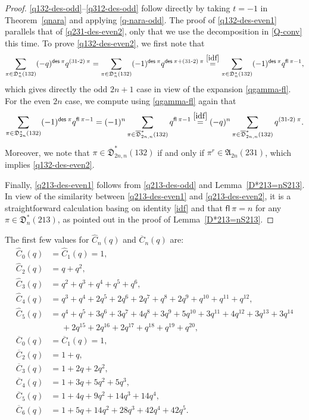 \documentclass[12pt,reqno]{amsart}
\numberwithin{equation}{section}
\theoremstyle{plain}
\theoremstyle{definition}
\def\D{\mathfrak{D}}
\def\A{\mathfrak{A}}
\def\des{\mathsf{des}}
\def\cab{31\text{-}2}
\def\fl{\mathsf{fl}}
\begin{document}
\begin{proof}
\eqref{q132-des-odd}--\eqref{q312-des-odd} follow directly by taking $t=-1$ in Theorem~\ref{qnara} and applying \eqref{q-nara-odd}. The proof of \eqref{q132-des-even1} parallels that of \eqref{q231-des-even2}, only that we use the decomposition in \eqref{Q-conv} this time. To prove \eqref{q132-des-even2}, we first note that
$$\sum_{\pi\in\D^*_n(132)}(-q)^{\des\:\pi}q^{(\cab)\:\pi}=\sum_{\pi\in\D^*_n(132)}(-1)^{\des\:\pi}q^{\des\:\pi+(\cab)\:\pi}\stackrel{\eqref{idf}}
{=}\sum_{\pi\in\D^*_n(132)}(-1)^{\des\:\pi}q^{\fl\:\pi-1},$$ which gives directly the odd $2n+1$ case in view of the expansion \eqref{qgamma-fl}. For the even $2n$ case, we compute using \eqref{qgamma-fl} again that
$$\sum_{\pi\in\D^*_{2n}(132)}(-1)^{\des\:\pi}q^{\fl\:\pi-1}=(-1)^n\sum_{\pi\in\overline{\D}^*_{2n,n}(132)}q^{\fl\:\pi-1}\stackrel{\eqref{idf}}
{=}(-q)^n\sum_{\pi\in\overline{\D}^*_{2n,n}(132)}q^{(\cab)\:\pi}.$$
Moreover, we note that $\pi\in \overline{\D}^*_{2n,n}(132)$ if and only if $\pi^r\in \A_{2n}(231)$, which implies \eqref{q132-des-even2}.

Finally, \eqref{q213-des-even1} follows from \eqref{q213-des-odd} and Lemma~\ref{D*213=nS213}. In view of the similarity between \eqref{q213-des-even1} and \eqref{q213-des-even2}, it is a straightforward calculation basing on identity \eqref{idf} and that $\fl\:\pi=n$ for any $\pi\in\D^*_n(213)$, as pointed out in the proof of Lemma~\ref{D*213=nS213}.
\end{proof}


The first few values for $\widehat{C}_n(q)$ and $\overline{C}_n(q)$ are:
\begin{align*}
\widehat{C}_0(q) &=\widehat{C}_1(q) =1,\\
\widehat{C}_2(q) &=q+q^2,\\
\widehat{C}_3(q) &=q^2+q^3+q^4+q^5+q^6,\\
\widehat{C}_4(q) &=q^3+q^4+2q^5+2q^6+2q^7+q^8+2q^9+q^{10}+q^{11}+q^{12},\\
\widehat{C}_5(q) &=q^4+q^5+3q^6+3q^7+4q^8+3q^9+5q^{10}+3q^{11}+4q^{12}+3q^{13}+3q^{14}\\
&\phantom{=}+2q^{15}+2q^{16}+2q^{17}+q^{18}+q^{19}+q^{20},\\
\overline{C}_0(q) &=\overline{C}_1(q)=1,\\
\overline{C}_2(q) &=1+q,\\
\overline{C}_3(q) &=1+2q+2q^2,\\
\overline{C}_4(q) &=1+3q+5q^2+5q^3,\\
\overline{C}_5(q) &=1+4q+9q^2+14q^3+14q^4,\\
\overline{C}_6(q) &=1+5q+14q^2+28q^3+42q^4+42q^5.
\end{align*}
\end{document}
